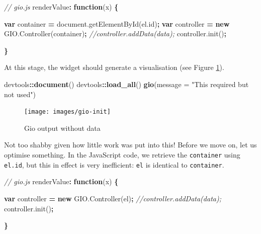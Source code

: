 \documentclass[10pt,]{krantz}
\makeatletter
\newenvironment{Shaded}{\begin{snugshade}}{\end{snugshade}}
\newcommand{\AttributeTok}[1]{\textcolor[rgb]{0.61,0.61,0.61}{#1}}
\newcommand{\CommentTok}[1]{\textcolor[rgb]{0.37,0.37,0.37}{\textit{#1}}}
\newcommand{\DataTypeTok}[1]{\textcolor[rgb]{0.27,0.27,0.27}{#1}}
\newcommand{\KeywordTok}[1]{\textcolor[rgb]{0.27,0.27,0.27}{\textbf{#1}}}
\newcommand{\NormalTok}[1]{#1}
\newcommand{\OperatorTok}[1]{\textcolor[rgb]{0.43,0.43,0.43}{\textbf{#1}}}
\newcommand{\StringTok}[1]{\textcolor[rgb]{0.5,0.5,0.5}{#1}}
\newcommand{\VariableTok}[1]{\textcolor[rgb]{0,0,0}{#1}}
\newenvironment{kframe}{%
\medskip{}
\setlength{\fboxsep}{.8em}
 \def\at@end@of@kframe{}%
 \ifinner\ifhmode%
  \def\at@end@of@kframe{\end{minipage}}%
  \begin{minipage}{\columnwidth}%
 \fi\fi%
 \def\FrameCommand##1{\hskip\@totalleftmargin \hskip-\fboxsep
 \colorbox{shadecolor}{##1}\hskip-\fboxsep
     \hskip-\linewidth \hskip-\@totalleftmargin \hskip\columnwidth}%
 \MakeFramed {\advance\hsize-\width
   \@totalleftmargin\z@ \linewidth\hsize
   \@setminipage}}%
 {\par\unskip\endMakeFramed%
 \at@end@of@kframe}
\renewenvironment{Shaded}{\begin{kframe}}{\end{kframe}}
\makeatother
\begin{document}
\begin{Shaded}
\begin{Highlighting}[]
\CommentTok{// gio.js}
\NormalTok{renderValue}\OperatorTok{:} \KeywordTok{function}\NormalTok{(x) }\OperatorTok{\{}

  \KeywordTok{var}\NormalTok{ container }\OperatorTok{=} \VariableTok{document}\NormalTok{.}\AttributeTok{getElementById}\NormalTok{(}\VariableTok{el}\NormalTok{.}\AttributeTok{id}\NormalTok{)}\OperatorTok{;}
  \KeywordTok{var}\NormalTok{ controller }\OperatorTok{=} \KeywordTok{new} \VariableTok{GIO}\NormalTok{.}\AttributeTok{Controller}\NormalTok{(container)}\OperatorTok{;}
  \CommentTok{//controller.addData(data);}
  \VariableTok{controller}\NormalTok{.}\AttributeTok{init}\NormalTok{()}\OperatorTok{;}

\OperatorTok{\}}
\end{Highlighting}
\end{Shaded}

At this stage, the widget should generate a visualisation (see Figure \ref{fig:gio-init}).

\begin{Shaded}
\begin{Highlighting}[]
\NormalTok{devtools}\OperatorTok{::}\KeywordTok{document}\NormalTok{()}
\NormalTok{devtools}\OperatorTok{::}\KeywordTok{load_all}\NormalTok{()}
\KeywordTok{gio}\NormalTok{(}\DataTypeTok{message =} \StringTok{"This required but not used"}\NormalTok{)}
\end{Highlighting}
\end{Shaded}

\begin{figure}[H]

{\centering \texttt{[image: images/gio-init]} 

}

\caption{Gio output without data}\label{fig:gio-init}
\end{figure}

Not too shabby given how little work was put into this! Before we move on, let us optimise something. In the JavaScript code, we retrieve the \texttt{container} using \texttt{el.id}, but this in effect is very inefficient: \texttt{el} is identical to \texttt{container}.

\begin{Shaded}
\begin{Highlighting}[]
\CommentTok{// gio.js}
\NormalTok{renderValue}\OperatorTok{:} \KeywordTok{function}\NormalTok{(x) }\OperatorTok{\{}

  \KeywordTok{var}\NormalTok{ controller }\OperatorTok{=} \KeywordTok{new} \VariableTok{GIO}\NormalTok{.}\AttributeTok{Controller}\NormalTok{(el)}\OperatorTok{;}
  \CommentTok{//controller.addData(data);}
  \VariableTok{controller}\NormalTok{.}\AttributeTok{init}\NormalTok{()}\OperatorTok{;}

\OperatorTok{\}}
\end{Highlighting}
\end{Shaded}
\end{document}
